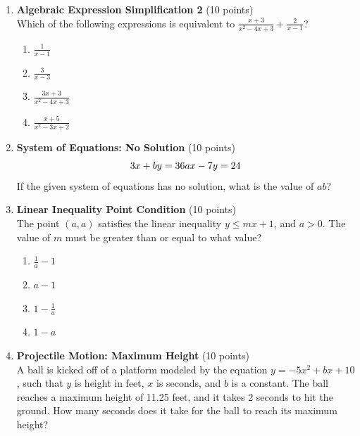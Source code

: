 \begin{enumerate}
  \item \textbf{Algebraic Expression Simplification 2} (10 points)\\
  Which of the following expressions is equivalent to $\frac{x+3}{x^2-4x+3}+\frac{2}{x-1}$?
  \begin{enumerate}[label=(\Alph*)]
    \item $\frac{1}{x-1}$
    \item $\frac{3}{x-3}$
    \item $\frac{3x+3}{x^2-4x+3}$
    \item $\frac{x+5}{x^2-3x+2}$
  \end{enumerate}
  \begin{subanswer}
  \end{subanswer}

  \newpage

  \item \textbf{System of Equations: No Solution} (10 points)\\
  \[
    3x+by=36 \\
    ax-7y=24
  \]
  If the given system of equations has no solution, what is the value of $ab$?
  \begin{subanswer}
  \end{subanswer}

  \item \textbf{Linear Inequality Point Condition} (10 points)\\
  The point $(a,a)$ satisfies the linear inequality $y\leq mx+1$, and $a>0$. The value of $m$ must be greater than or equal to what value?
  \begin{enumerate}[label=(\Alph*)]
    \item $\frac{1}{a}-1$
    \item $a-1$
    \item $1-\frac{1}{a}$
    \item $1-a$
  \end{enumerate}
  \begin{subanswer}
  \end{subanswer}

  \item \textbf{Projectile Motion: Maximum Height} (10 points)\\
  A ball is kicked off of a platform modeled by the equation $y=-5x^2+bx+10$, such that $y$ is height in feet, $x$ is seconds, and $b$ is a constant. The ball reaches a maximum height of 11.25 feet, and it takes 2 seconds to hit the ground. How many seconds does it take for the ball to reach its maximum height?
  \begin{subanswer}
  \end{subanswer}


\end{enumerate}


